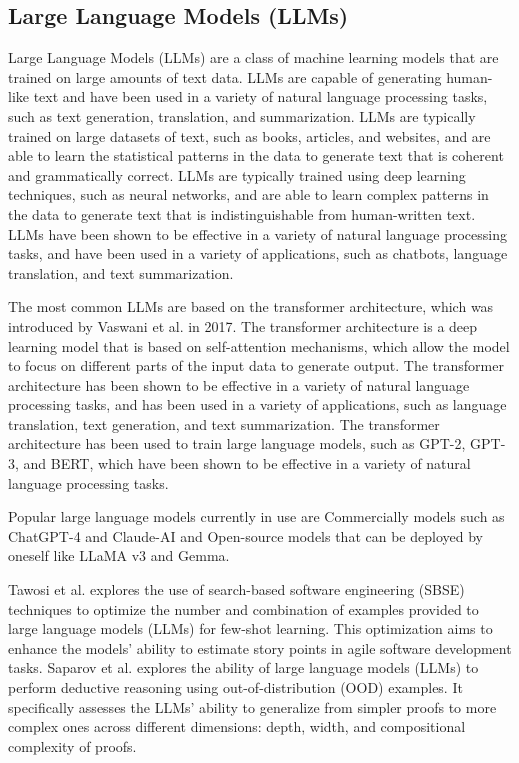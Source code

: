 \documentclass{ieeeaccess}
\begin{document}
\subsection{Large Language Models (LLMs)}

Large Language Models (LLMs) are a class of machine learning models that are trained on large amounts of text data. LLMs are capable of generating human-like text and have been used in a variety of natural language processing tasks, such as text generation, translation, and summarization. LLMs are typically trained on large datasets of text, such as books, articles, and websites, and are able to learn the statistical patterns in the data to generate text that is coherent and grammatically correct. LLMs are typically trained using deep learning techniques, such as neural networks, and are able to learn complex patterns in the data to generate text that is indistinguishable from human-written text. LLMs have been shown to be effective in a variety of natural language processing tasks, and have been used in a variety of applications, such as chatbots, language translation, and text summarization.

The most common LLMs are based on the transformer architecture, which was introduced by Vaswani et al. in 2017. The transformer architecture is a deep learning model that is based on self-attention mechanisms, which allow the model to focus on different parts of the input data to generate output. The transformer architecture has been shown to be effective in a variety of natural language processing tasks, and has been used in a variety of applications, such as language translation, text generation, and text summarization. The transformer architecture has been used to train large language models, such as GPT-2\cite{radford2019language}, GPT-3\cite{brown2020language}, and BERT\cite{devlin2018bert}, which have been shown to be effective in a variety of natural language processing tasks.

Popular large language models currently in use are Commercially models such as ChatGPT-4\cite{chatgpt4} and Claude-AI\cite{claudeai} and Open-source models that can be deployed by oneself like LLaMA v3\cite{llama} and Gemma\cite{gemma}.


Tawosi et al.\cite{Tawosi_2023} explores the use of search-based software engineering (SBSE) techniques to optimize the number and combination of examples provided to large language models (LLMs) for few-shot learning. This optimization aims to enhance the models' ability to estimate story points in agile software development tasks. Saparov et al.\cite{saparov2023testing} explores the ability of large language models (LLMs) to perform deductive reasoning using out-of-distribution (OOD) examples. It specifically assesses the LLMs' ability to generalize from simpler proofs to more complex ones across different dimensions: depth, width, and compositional complexity of proofs. 
\end{document}
